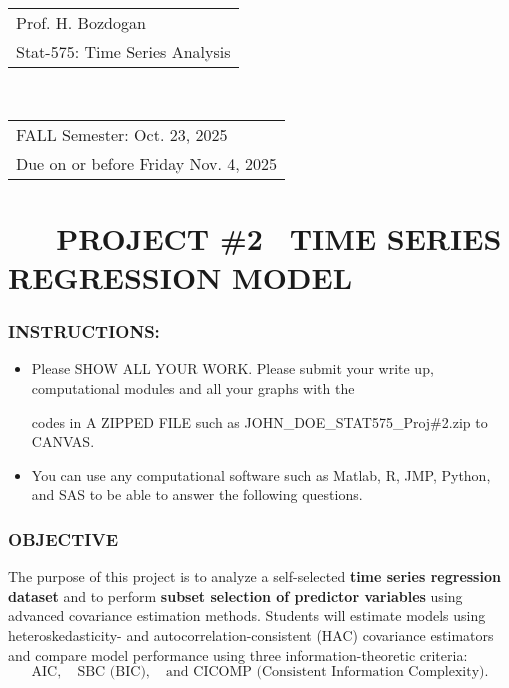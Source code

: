 \documentclass[12pt,thmsa]{article}
\begin{document}
\begin{tabular}{l}
Prof. H. Bozdogan \ \ \  \\ 
Stat-575: Time Series Analysis%
\end{tabular}
\ \ \ \ \ \ \ \ \ \ \ \ \ \ \ \ \ \ \ \ \ \ 
\begin{tabular}{l}
FALL Semester: Oct. 23, 2025 \\ 
Due on or before Friday Nov. 4, 2025%
\end{tabular}

\smallskip

\section{ \ \ \ PROJECT \#2 \ TIME SERIES REGRESSION MODEL}

\smallskip

\subsubsection{INSTRUCTIONS:}

\smallskip

\begin{itemize}
\item Please SHOW ALL YOUR WORK. Please submit your write up, computational
modules and all your graphs with the

codes in A ZIPPED FILE such as JOHN\_DOE\_STAT575\_Proj\#2.zip to CANVAS.
\end{itemize}

\smallskip

\begin{itemize}
\item You can use any computational software such as Matlab, R, JMP, Python,
and SAS to be able to answer the following questions.
\end{itemize}

\vspace{1pt}

\subsubsection{OBJECTIVE}

\vspace{1pt}

The purpose of this project is to analyze a self-selected \textbf{time
series regression dataset} and to perform \textbf{subset selection of
predictor variables} using advanced covariance estimation methods. Students
will estimate models using heteroskedasticity- and
autocorrelation-consistent (HAC) covariance estimators and compare model
performance using three information-theoretic criteria: 
\begin{equation*}
\text{AIC},\quad \text{SBC (BIC)},\quad \text{and CICOMP (Consistent
Information Complexity)}.
\end{equation*}
\end{document}
